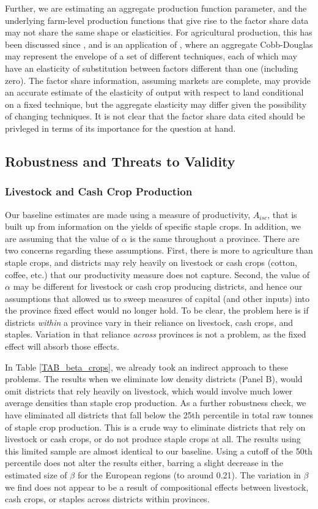 \documentclass[11pt]{article}
\begin{document}
Further, we are estimating an aggregate production function parameter, and the underlying farm-level production functions that give rise to the factor share data may not share the same shape or elasticities. For agricultural production, this has been discussed since \citet{Hayami:1970ly}, and is an application of \citet{houthakker1955}, where an aggregate Cobb-Douglas may represent the envelope of a set of different techniques, each of which may have an elasticity of substitution between factors different than one (including zero). The factor share information, assuming markets are complete, may provide an accurate estimate of the elasticity of output with respect to land conditional on a fixed technique, but the aggregate elasticity may differ given the possibility of changing techniques. It is not clear that the factor share data cited should be privleged in terms of its importance for the question at hand.

\subsection{Robustness and Threats to Validity}
\subsubsection{Livestock and Cash Crop Production}
Our baseline estimates are made using a measure of productivity, $A_{isc}$, that is built up from information on the yields of specific staple crops. In addition, we are assuming that the value of $\alpha$ is the same throughout a province. There are two concerns regarding these assumptions. First, there is more to agriculture than staple crops, and districts may rely heavily on livestock or cash crops (cotton, coffee, etc.) that our productivity measure does not capture. Second, the value of $\alpha$ may be different for livestock or cash crop producing districts, and hence our assumptions that allowed us to sweep measures of capital (and other inputs) into the province fixed effect would no longer hold. To be clear, the problem here is if districts \textit{within} a province vary in their reliance on livestock, cash crops, and staples. Variation in that reliance \textit{across} provinces is not a problem, as the fixed effect will absorb those effects.

In Table \ref{TAB_beta_crops}, we already took an indirect approach to these problems. The results when we eliminate low density districts (Panel B), would omit districts that rely heavily on livestock, which would involve much lower average densities than staple crop production. As a further robustness check, we have eliminated all districts that fall below the 25th percentile in total raw tonnes of staple crop production. This is a crude way to eliminate districts that rely on livestock or cash crops, or do not produce staple crops at all. The results using this limited sample are almost identical to our baseline. Using a cutoff of the 50th percentile does not alter the results either, barring a slight decrease in the estimated size of $\beta$ for the European regions (to around 0.21). The variation in $\beta$ we find does not appear to be a result of compositional effects between livestock, cash crops, or staples across districts within provinces.
\end{document}
